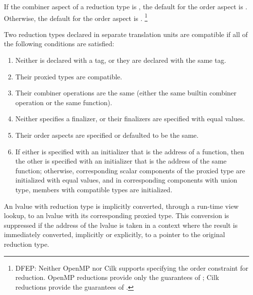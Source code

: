 \begin{description}
\begin{comment}
\begin{note}
It is likely that the implementation
will need to suppress concurrent execution of tasks
in order to ensure this (fully deterministic) modification order.
If so, there need not be more than one view,
and the combiner operation might not be invoked at all. 
\end{note}
\end{comment}
\end{description}

\pnum
If the combiner aspect of a reduction type is
,
the default for the order aspect is
.
Otherwise, the default for the order aspect is
.
\footnote{DFEP:
Neither OpenMP nor Cilk supports specifying the order constraint for reduction.
OpenMP reductions provide only the guarantees of
;
Cilk reductions provide the guarantees of
.
}

\pnum
Two reduction types declared in separate translation units
are compatible if all of the following conditions are satisfied:

\begin{enumerate}
\item
Neither is declared with a tag, or they are declared with the same tag.
\item
Their proxied types are compatible.
\item
Their combiner operations are the same
(either the same builtin combiner operation or the same function).
\item
Neither specifies a finalizer,
or their finalizers are specified with equal values.
\item
Their order aspects are specified or defaulted to be the same.
\item
If either is specified with an initializer that is the address of a function,
then the other is specified with an initializer
that is the address of the same function;
otherwise, corresponding scalar components of the proxied type
are initialized with equal values,
and in corresponding components with union type,
members with compatible types are initialized.
\end{enumerate}


\pnum
An lvalue with reduction type is implicitly converted,
through a run-time view lookup,
to an lvalue with its corresponding proxied type.
This conversion is suppressed
if the address of the lvalue is taken in a context
where the result is immediately converted,
implicitly or explicitly,
to a pointer to the original reduction type.


